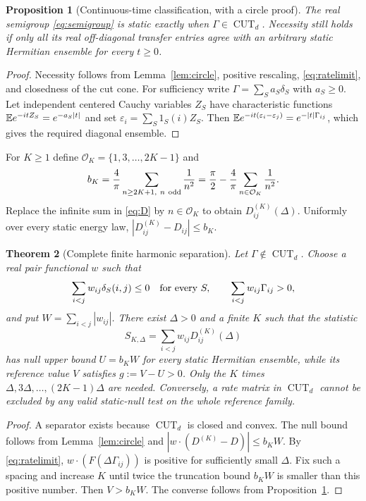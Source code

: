 \documentclass[11pt,a4paper]{article}
\newtheorem{theorem}{Theorem}[section]
\newtheorem{proposition}[theorem]{Proposition}
\theoremstyle{remark}\newtheorem{remark}[theorem]{Remark}
\newcommand{\CUT}{\operatorname{CUT}}
\begin{document}
\begin{proposition}[Continuous-time classification, with a circle proof]
\label{prop:classification}
The real semigroup \eqref{eq:semigroup} is static exactly when
$\Gamma\in\CUT_d$. Necessity still holds if only all its real
off-diagonal transfer entries agree with an arbitrary static Hermitian
ensemble for every $t\geq0$.
\end{proposition}
\begin{proof}
Necessity follows from Lemma~\ref{lem:circle}, positive rescaling,
\eqref{eq:ratelimit}, and closedness of the cut cone. For sufficiency
write $\Gamma=\sum_S a_S\delta_S$ with $a_S\geq0$. Let independent
centered Cauchy variables $Z_S$ have characteristic functions
$\mathbb E e^{-itZ_S}=e^{-a_S|t|}$ and set
$\varepsilon_i=\sum_S1_S(i)Z_S$. Then
$\mathbb E e^{-it(\varepsilon_i-\varepsilon_j)}=e^{-|t|\Gamma_{ij}}$,
which gives the required diagonal ensemble.
\end{proof}

For $K\geq1$ define $\mathcal O_K=\{1,3,\ldots,2K-1\}$ and
\begin{equation}\label{eq:tail}
 b_K=\frac4\pi\sum_{n\geq2K+1,\ n\ {\rm odd}}\frac1{n^2}
     =\frac\pi2-\frac4\pi\sum_{n\in\mathcal O_K}\frac1{n^2}.
\end{equation}
Replace the infinite sum in \eqref{eq:D} by $n\in\mathcal O_K$ to obtain
$D^{(K)}_{ij}(\Delta)$. Uniformly over every static energy law,
$|D^{(K)}_{ij}-D_{ij}|\leq b_K$.

\begin{theorem}[Complete finite harmonic separation]\label{thm:finite}
Let $\Gamma\notin\CUT_d$. Choose a real pair functional $w$ such that
\begin{equation}\label{eq:separator}
 \sum_{i<j}w_{ij}\delta_S(i,j)\leq0\quad\hbox{for every }S,
 \qquad \sum_{i<j}w_{ij}\Gamma_{ij}>0,
\end{equation}
and put $W=\sum_{i<j}|w_{ij}|$. There exist $\Delta>0$ and a finite
$K$ such that the statistic
\begin{equation}\label{eq:S}
 S_{K,\Delta}=\sum_{i<j}w_{ij}D^{(K)}_{ij}(\Delta)
\end{equation}
has null upper bound $U=b_KW$ for every static Hermitian ensemble,
while its reference value $V$ satisfies $g:=V-U>0$.
Only the $K$ times $\Delta,3\Delta,\ldots,(2K-1)\Delta$ are needed.
Conversely, a rate matrix in $\CUT_d$ cannot be excluded by any valid
static-null test on the whole reference family.
\end{theorem}
\begin{proof}
A separator exists because $\CUT_d$ is closed and convex.
The null bound follows from Lemma~\ref{lem:circle} and
$|w\cdot(D^{(K)}-D)|\leq b_KW$. By \eqref{eq:ratelimit},
$w\cdot(F(\Delta\Gamma_{ij}))$ is positive for sufficiently small
$\Delta$. Fix such a spacing and increase $K$ until twice the truncation
bound $b_KW$ is smaller than this positive number. Then $V>b_KW$.
The converse follows from Proposition~\ref{prop:classification}.
\end{proof}
\end{document}
